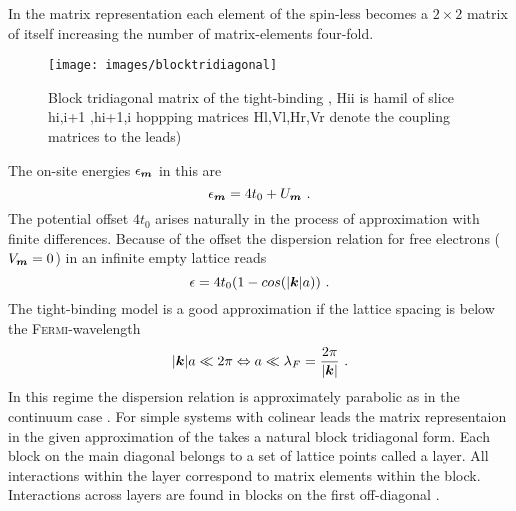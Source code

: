 In the matrix representation each element of the spin-less \hamil{} becomes a $2 \times 2$ matrix of itself increasing the number of matrix-elements four-fold.
\begin{figure}[h!]
\centering
\texttt{[image: images/blocktridiagonal]}
\caption{Block tridiagonal matrix of the tight-binding \hamil{}, Hii is hamil of slice hi,i+1 ,hi+1,i hoppping matrices Hl,Vl,Hr,Vr denote the coupling matrices to the leads)}
\label{fig:blocktridiagonal}
\end{figure}
The on-site energies $\epsilon_{\boldsymbol{m}}$ in this \hamil{} are
\begin{equation}
\epsilon_{\boldsymbol{m}} = 4t_0 + U_{\boldsymbol{m}}\ .
\end{equation}
The potential offset $4t_0$ arises naturally in the process of approximation with finite differences. Because of the offset the dispersion relation for free electrons ($V_{\boldsymbol{m}}=0$) in an infinite empty lattice reads
\begin{equation}
\epsilon = 4t_0(1-cos(\lvert\boldsymbol{k}\rvert a))\ .
\end{equation}
The tight-binding model is a good approximation if the lattice spacing is below the \textsc{Fermi}-wavelength
\begin{equation}
\lvert\boldsymbol{k}\rvert a \ll  2\pi \Leftrightarrow a \ll \lambda_F = \frac{2\pi}{\lvert\boldsymbol{k}\rvert} \ .
\end{equation}
In this regime the dispersion relation is approximately parabolic as in the continuum case \cite{Metalidis2007Thesis}.
For simple systems with colinear leads the matrix representaion in the given approximation of the \hamil{} takes a natural block tridiagonal form. Each block on the main diagonal belongs to a set of lattice points called a layer. All interactions within the layer correspond to matrix elements within the block. Interactions across layers are found in blocks on the first off-diagonal \cite{AnLunNik2008}.
